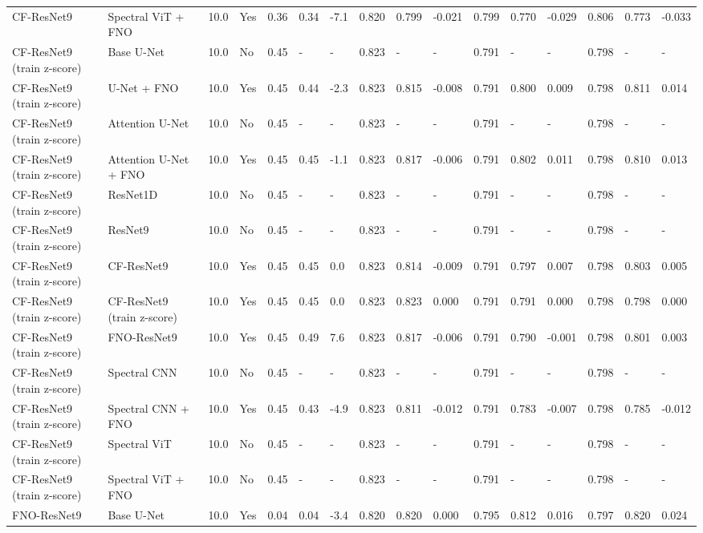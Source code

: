 \begin{longtable}{llllllllllllllll}
CF-ResNet9 & Spectral ViT + FNO & 10.0 & Yes & 0.36 & 0.34 & -7.1 & 0.820 & 0.799 & -0.021 & 0.799 & 0.770 & -0.029 & 0.806 & 0.773 & -0.033 \\
CF-ResNet9 (train z-score) & Base U-Net & 10.0 & No & 0.45 & - & - & 0.823 & - & - & 0.791 & - & - & 0.798 & - & - \\
CF-ResNet9 (train z-score) & U-Net + FNO & 10.0 & Yes & 0.45 & 0.44 & -2.3 & 0.823 & 0.815 & -0.008 & 0.791 & 0.800 & 0.009 & 0.798 & 0.811 & 0.014 \\
CF-ResNet9 (train z-score) & Attention U-Net & 10.0 & No & 0.45 & - & - & 0.823 & - & - & 0.791 & - & - & 0.798 & - & - \\
CF-ResNet9 (train z-score) & Attention U-Net + FNO & 10.0 & Yes & 0.45 & 0.45 & -1.1 & 0.823 & 0.817 & -0.006 & 0.791 & 0.802 & 0.011 & 0.798 & 0.810 & 0.013 \\
CF-ResNet9 (train z-score) & ResNet1D & 10.0 & No & 0.45 & - & - & 0.823 & - & - & 0.791 & - & - & 0.798 & - & - \\
CF-ResNet9 (train z-score) & ResNet9 & 10.0 & No & 0.45 & - & - & 0.823 & - & - & 0.791 & - & - & 0.798 & - & - \\
CF-ResNet9 (train z-score) & CF-ResNet9 & 10.0 & Yes & 0.45 & 0.45 & 0.0 & 0.823 & 0.814 & -0.009 & 0.791 & 0.797 & 0.007 & 0.798 & 0.803 & 0.005 \\
CF-ResNet9 (train z-score) & CF-ResNet9 (train z-score) & 10.0 & Yes & 0.45 & 0.45 & 0.0 & 0.823 & 0.823 & 0.000 & 0.791 & 0.791 & 0.000 & 0.798 & 0.798 & 0.000 \\
CF-ResNet9 (train z-score) & FNO-ResNet9 & 10.0 & Yes & 0.45 & 0.49 & 7.6 & 0.823 & 0.817 & -0.006 & 0.791 & 0.790 & -0.001 & 0.798 & 0.801 & 0.003 \\
CF-ResNet9 (train z-score) & Spectral CNN & 10.0 & No & 0.45 & - & - & 0.823 & - & - & 0.791 & - & - & 0.798 & - & - \\
CF-ResNet9 (train z-score) & Spectral CNN + FNO & 10.0 & Yes & 0.45 & 0.43 & -4.9 & 0.823 & 0.811 & -0.012 & 0.791 & 0.783 & -0.007 & 0.798 & 0.785 & -0.012 \\
CF-ResNet9 (train z-score) & Spectral ViT & 10.0 & No & 0.45 & - & - & 0.823 & - & - & 0.791 & - & - & 0.798 & - & - \\
CF-ResNet9 (train z-score) & Spectral ViT + FNO & 10.0 & No & 0.45 & - & - & 0.823 & - & - & 0.791 & - & - & 0.798 & - & - \\
FNO-ResNet9 & Base U-Net & 10.0 & Yes & 0.04 & 0.04 & -3.4 & 0.820 & 0.820 & 0.000 & 0.795 & 0.812 & 0.016 & 0.797 & 0.820 & 0.024 \\

\end{longtable}

